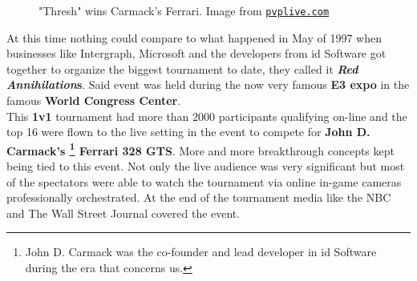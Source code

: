 \begin{figure}
	\begin{center}
		
		\caption{"Thresh" wins Carmack's Ferrari. Image from \href{https://pvplive.com/c/cars-esports-prize-tournaments}{\nolinkurl{pvplive.com}}}
	\end{center}
\end{figure}

At this time nothing could compare to what happened in May of 1997 when businesses like Intergraph, Microsoft and the developers from id Software got together to organize the biggest tournament to date, they called it \textbf{\textit{Red Annihilation}s}. Said event was held during the now very famous \textbf{E3 expo} \citep{e3} in the famous \textbf{World Congress Center}.\\


This \textbf{1v1} tournament had more than 2000 participants qualifying on-line and the top 16 were flown to the live setting in the event to compete for \textbf{John D. Carmack's \footnote{John D. Carmack was the co-founder and lead developer in id Software during the era that concerns us.} Ferrari 328 GTS}. More and more breakthrough concepts kept being tied to this event. Not only the live audience was very significant but most of the spectators were able to watch the tournament via online in-game cameras professionally orchestrated. At the end of the tournament media like the NBC and The Wall Street Journal covered the event.\\

